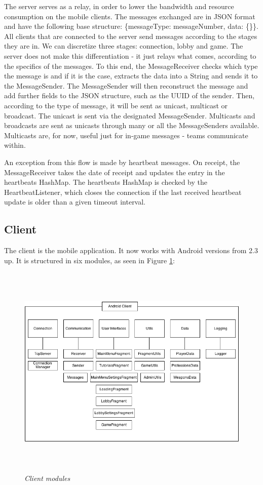 The server serves as a relay, in order to lower the bandwidth and
resource consumption on the mobile clients. The messages exchanged are in
JSON format and have the following base structure: \{messageType: messageNumber,
data: \{\}\}. All clients that are connected to the server send messages
according to the stages they are in. We can discretize three stages: connection,
lobby and game. The server does not make this differentiation - it just relays
what comes, according to the specifics of the messages. To this end, the
MessageReceiver checks which type the message is and if it is the case, extracts
the data into a String and sends it to the MessageSender. The MessageSender will
then reconstruct the message and add further fields to the JSON structure, such
as the UUID of the sender. Then, according to the type of message, it will be
sent as unicast, multicast or broadcast. The unicast is sent via the designated
MessageSender. Multicasts and broadcasts are sent as unicasts through many or
all the MessageSenders available. Multicasts are, for now, useful just for
in-game messages - teams communicate within.\newline

An exception from this flow is made by heartbeat messages. On receipt, the
MessageReceiver takes the date of receipt and updates the entry in the
heartbeats HashMap. The heartbeats HashMap is checked by the HeartbeatListener,
which closes the connection if the last received heartbeat update is older than
a given timeout interval.\newline


\subsection{Client}

The client is the mobile application. It now works with Android versions from
2.3 up. It is structured in six modules, as seen in Figure \ref{fig:clientModules}:

\begin{figure}
\includegraphics[height=4.08in,width=6.23in]{./images/diagrams/client_modules.png}  
\caption{\small \sl Client modules \label{fig:clientModules}}
\end{figure}

